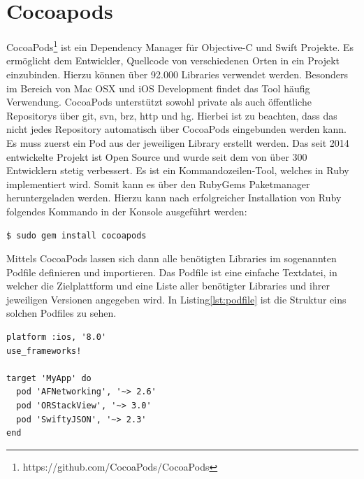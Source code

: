     \newpage
    \section{Cocoapods}\label{sec:cocoapods}
    CocoaPods\footnote{https://github.com/CocoaPods/CocoaPods} ist ein Dependency Manager für Objective-C und Swift Projekte.
    Es ermöglicht dem Entwickler, Quellcode von verschiedenen Orten in ein Projekt einzubinden.
    Hierzu können über 92.000 Libraries verwendet werden.
    Besonders im Bereich von Mac OSX und iOS Development findet das Tool häufig Verwendung.
    CocoaPods unterstützt sowohl private als auch öffentliche Repositorys über git, svn, brz, http und hg.
    Hierbei ist zu beachten, dass das nicht jedes Repository automatisch über CocoaPods eingebunden werden kann.
    Es muss zuerst ein Pod aus der jeweiligen Library erstellt werden.
    Das seit 2014 entwickelte Projekt ist Open Source und wurde seit dem von über 300 Entwicklern stetig verbessert.
    Es ist ein Kommandozeilen-Tool, welches in Ruby implementiert wird.
    Somit kann es über den RubyGems Paketmanager heruntergeladen werden.
    Hierzu kann nach erfolgreicher Installation von Ruby folgendes Kommando in der Konsole ausgeführt werden:
    \begin{lstlisting}[language=bash,label={lst:cocoapods}]
        $ sudo gem install cocoapods
    \end{lstlisting}
    Mittels CocoaPods lassen sich dann alle benötigten Libraries im sogenannten Podfile definieren und importieren.
    Das Podfile ist eine einfache Textdatei, in welcher die Zielplattform und eine Liste aller benötigter Libraries und ihrer jeweiligen Versionen angegeben wird.
    In Listing\ref{lst:podfile} ist die Struktur eins solchen Podfiles zu sehen.
    ~\cite{cocoapods1, cocoapods2, cocoapods3}
    \begin{lstlisting}[language={},firstnumber=1,label={lst:podfile},caption={Beispielstuktur eines Podfiles},captionpos=t]
platform :ios, '8.0'
use_frameworks!

target 'MyApp' do
  pod 'AFNetworking', '~> 2.6'
  pod 'ORStackView', '~> 3.0'
  pod 'SwiftyJSON', '~> 2.3'
end
    \end{lstlisting}


